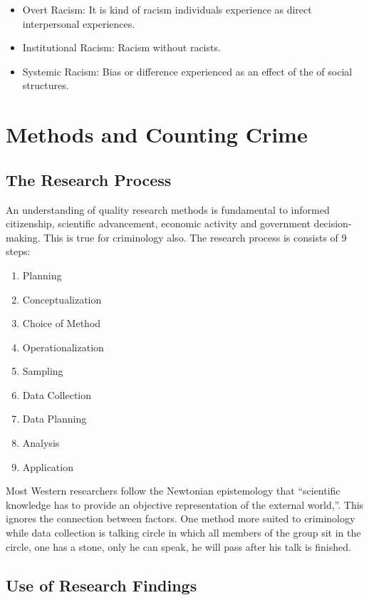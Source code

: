 \documentclass[11pt]{article}
\begin{document}
\begin{itemize}
    \item Overt Racism: It is kind of racism individuals experience as direct interpersonal experiences.
    
    \item Institutional Racism: Racism without racists.
    
    \item Systemic Racism: Bias or difference experienced as an 
    effect of the of social structures.
\end{itemize}

\section{Methods and Counting Crime}

\subsection{The Research Process}

An understanding of quality research methods is fundamental to informed citizenship, scientific advancement, economic activity and government decision-making. This is true for criminology also. The research process is consists of 9 steps:

\begin{enumerate}
    \item Planning
    \item Conceptualization
    \item Choice of Method
    \item Operationalization
    \item Sampling
    \item Data Collection
    \item Data Planning
    \item Analysis
    \item Application
\end{enumerate}

Most Western researchers follow the Newtonian epistemology that “scientific knowledge has to provide an objective representation of the external world,”. This ignores the connection between factors. One method more suited to criminology while data collection is talking circle in which all members of the group sit in the circle, one has a stone, only he can speak, he will pass after his talk is finished.

\subsection{Use of Research Findings}
\end{document}
